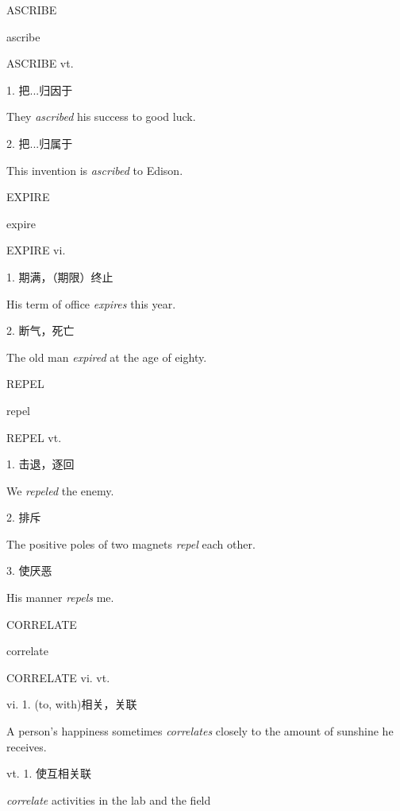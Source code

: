\begin{flashcard}{
ASCRIBE

ascribe
}
\begin{center}
ASCRIBE vt. 
\end{center}
1. 把...归因于

They \textit{ascribed} his success to good luck.

2. 把...归属于

This invention is \textit{ascribed} to Edison.

\end{flashcard}
\begin{flashcard}{
EXPIRE

expire
}
\begin{center}
EXPIRE vi. 
\end{center}
1. 期满，（期限）终止

His term of office \textit{expires} this year.

2. 断气，死亡

The old man \textit{expired} at the age of eighty.

\end{flashcard}
\begin{flashcard}{
REPEL

repel
}
\begin{center}
REPEL vt. 
\end{center}
1. 击退，逐回

We \textit{repeled} the enemy.

2. 排斥

The positive poles of two magnets \textit{repel} each other.

3. 使厌恶

His manner \textit{repels} me.

\end{flashcard}
\begin{flashcard}{
CORRELATE

correlate
}
\begin{center}
CORRELATE vi. vt. 
\end{center}
vi. 1. (to, with)相关，关联

A person's happiness sometimes \textit{correlates} closely to the amount of sunshine he receives.

vt. 1. 使互相关联

\textit{correlate} activities in the lab and the field

\end{flashcard}
